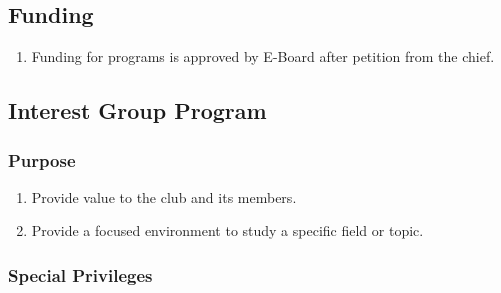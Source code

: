 \documentclass{article}
\begin{document}
\subsection{Funding}

\begin{enumerate}
  \item Funding for programs is approved by E-Board after petition from the
    chief.
\end{enumerate}

\subsection{Interest Group Program}

\subsubsection{Purpose}

\begin{enumerate}
  \item Provide value to the club and its members.
  \item Provide a focused environment to study a specific field or topic.
\end{enumerate}

\subsubsection{Special Privileges}
\end{document}
